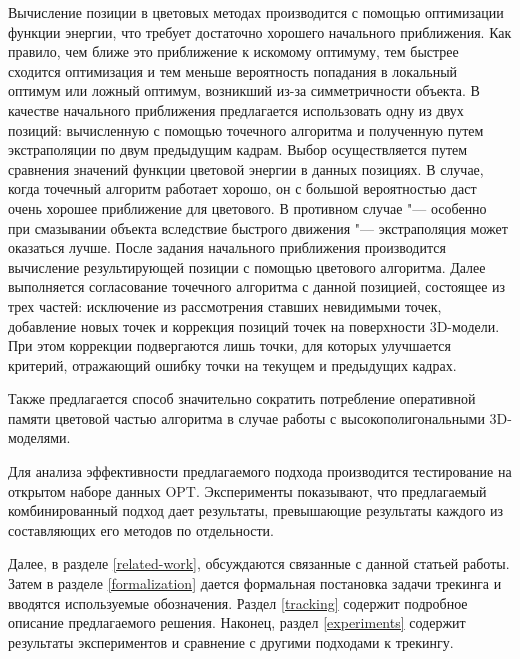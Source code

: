 Вычисление позиции в цветовых методах производится с помощью оптимизации
функции энергии, что требует достаточно хорошего начального приближения.
Как правило, чем ближе это приближение к искомому оптимуму, тем быстрее
сходится оптимизация и тем меньше вероятность попадания в локальный оптимум или
ложный оптимум, возникший из-за симметричности объекта.
В качестве начального приближения предлагается использовать одну из двух
позиций: вычисленную с помощью точечного алгоритма и полученную путем
экстраполяции по двум предыдущим кадрам.
Выбор осуществляется путем сравнения значений функции цветовой энергии в данных
позициях.
В случае, когда точечный алгоритм работает хорошо, он с большой вероятностью
даст очень хорошее приближение для цветового.
В противном случае "--- особенно при смазывании объекта вследствие
быстрого движения "--- экстраполяция может оказаться лучше.
После задания начального приближения производится вычисление результирующей
позиции с помощью цветового алгоритма.
Далее выполняется согласование точечного алгоритма с данной позицией, состоящее
из трех частей: исключение из рассмотрения ставших невидимыми точек,
добавление новых точек и коррекция позиций точек на поверхности 3D-модели.
При этом коррекции подвергаются лишь точки, для которых улучшается
критерий, отражающий ошибку точки на текущем и предыдущих кадрах.

Также предлагается способ значительно сократить потребление оперативной памяти
цветовой частью алгоритма в случае работы с высокополигональными 3D-моделями.

Для анализа эффективности предлагаемого подхода производится тестирование
на открытом наборе данных OPT\cite{OPT}.
Эксперименты показывают, что предлагаемый комбинированный подход дает
результаты, превышающие результаты каждого из составляющих его методов по
отдельности.

Далее, в разделе \ref{related-work}, обсуждаются связанные с данной статьей
работы.
Затем в разделе \ref{formalization} дается формальная постановка задачи
трекинга и вводятся используемые обозначения.
Раздел \ref{tracking} содержит подробное описание предлагаемого решения.
Наконец, раздел \ref{experiments} содержит результаты экспериментов и сравнение
с другими подходами к трекингу.
